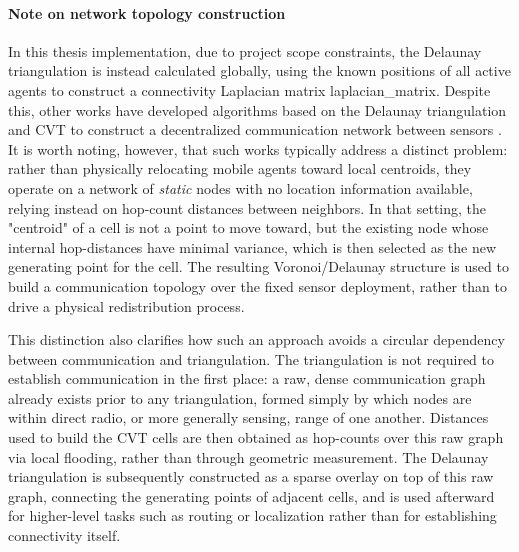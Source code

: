\paragraph{Note on network topology construction}
In this thesis implementation, due to project scope constraints, the Delaunay triangulation is instead calculated globally, using the known positions of all active agents to construct a connectivity Laplacian matrix \gls{laplacian_matrix}. Despite this, other works have developed algorithms based on the Delaunay triangulation and \gls{CVT} to construct a decentralized communication network between sensors \cite{10.1145/2491288.2491296}. It is worth noting, however, that such works typically address a distinct problem: rather than physically relocating mobile agents toward local centroids, they operate on a network of \emph{static} nodes with no location information available, relying instead on hop-count distances between neighbors. In that setting, the "centroid" of a cell is not a point to move toward, but the existing node whose internal hop-distances have minimal variance, which is then selected as the new generating point for the cell. The resulting Voronoi/Delaunay structure is used to build a communication topology over the fixed sensor deployment, rather than to drive a physical redistribution process.

This distinction also clarifies how such an approach avoids a circular dependency between communication and triangulation. The triangulation is not required to establish communication in the first place: a raw, dense communication graph already exists prior to any triangulation, formed simply by which nodes are within direct radio, or more generally sensing, range of one another. Distances used to build the CVT cells are then obtained as hop-counts over this raw graph via local flooding, rather than through geometric measurement. The Delaunay triangulation is subsequently constructed as a sparse overlay on top of this raw graph, connecting the generating points of adjacent cells, and is used afterward for higher-level tasks such as routing or localization rather than for establishing connectivity itself.

